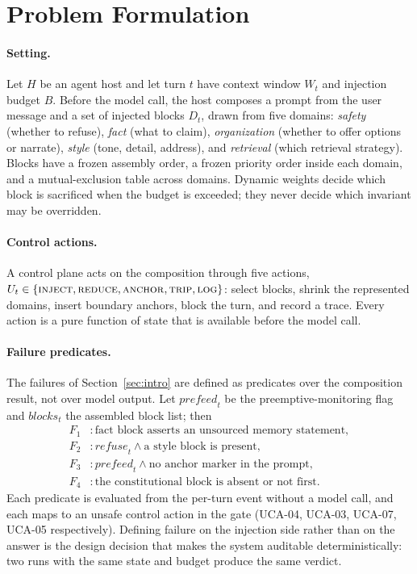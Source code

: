 \section{Problem Formulation}\label{sec:problem}

\paragraph{Setting.} Let $H$ be an agent host and let turn $t$ have context
window $W_t$ and injection budget $B$. Before the model call, the host composes
a prompt from the user message and a set of injected blocks $D_t$, drawn from
five domains: \emph{safety} (whether to refuse), \emph{fact} (what to claim),
\emph{organization} (whether to offer options or narrate), \emph{style} (tone,
detail, address), and \emph{retrieval} (which retrieval strategy). Blocks have a
frozen assembly order, a frozen priority order inside each domain, and a
mutual-exclusion table across domains. Dynamic weights decide which block is
sacrificed when the budget is exceeded; they never decide which invariant may be
overridden.

\paragraph{Control actions.} A control plane acts on the composition through
five actions,
$U_t \in \{\text{\textsc{inject}}, \text{\textsc{reduce}},
\text{\textsc{anchor}}, \text{\textsc{trip}}, \text{\textsc{log}}\}$:
select blocks, shrink the represented domains, insert boundary anchors, block
the turn, and record a trace. Every action is a pure function of state that is
available before the model call.

\paragraph{Failure predicates.} The failures of Section~\ref{sec:intro} are
defined as predicates over the composition result, not over model output. Let
$\mathit{prefeed}_t$ be the preemptive-monitoring flag and $\mathit{blocks}_t$
the assembled block list; then
\begin{align}
F_1 &: \text{fact block asserts an unsourced memory statement},\\
F_2 &: \mathit{refuse}_t \wedge \text{a style block is present},\\
F_3 &: \mathit{prefeed}_t \wedge \text{no anchor marker in the prompt},\\
F_4 &: \text{the constitutional block is absent or not first}.
\end{align}
Each predicate is evaluated from the per-turn event without a model call, and
each maps to an unsafe control action in the gate (UCA-04, UCA-03, UCA-07,
UCA-05 respectively). Defining failure on the injection side rather than on the
answer is the design decision that makes the system auditable
deterministically: two runs with the same state and budget produce the same
verdict.

